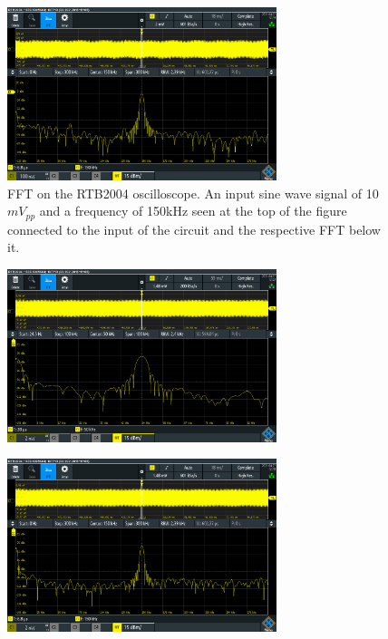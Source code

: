 \begin{figure}[h]
    \centering
    \includegraphics[width=0.7\textwidth]{graphics/FFTRas150k_Ac1x1.PNG}
    \caption{FFT on the RTB2004 oscilloscope. 
    An input sine wave signal of 10$mV_{pp}$ and a frequency of 150kHz seen at the top of the figure connected to the input of the circuit  and the respective FFT below it.}
    \label{fig:FFTRas150}
\end{figure}

\begin{figure}[h]
    \centering
    \includegraphics[width=0.7\textwidth]{graphics/FFTGenerator50k_AC1x1.PNG}
    \caption{}
    \label{fig:FFTGene50}
\end{figure}

\begin{figure}[h]
    \centering
    \includegraphics[width=0.7\textwidth]{graphics/FFTGenerator150k_Ac1x1.PNG}
    \caption{}
    \label{fig:FFTGene100}
\end{figure}

